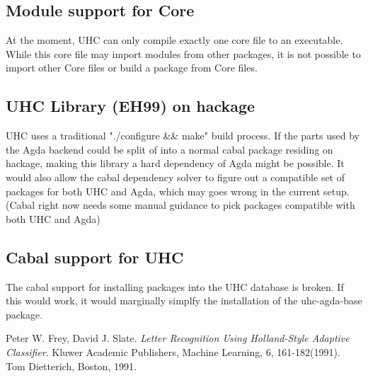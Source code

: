 \documentclass[12pt, a4paper, twoside]{report}
\begin{document}
\subsection{Module support for Core}
At the moment, UHC can only compile exactly one core file to an executable.
While this core file may import modules from other packages, it is not possible
to import other Core files or build a package from Core files.

\subsection{UHC Library (EH99) on hackage}
UHC uses a traditional "./configure \&\& make" build process. If the parts used by the
Agda backend could be split of into a normal cabal package residing on hackage,
making this library a hard dependency of Agda might be possible.
It would also allow the cabal dependency solver to figure out a compatible
set of packages for both UHC and Agda, which may goes wrong in the current setup.
(Cabal right now needs some manual guidance to pick packages compatible with both UHC and Agda)

\subsection{Cabal support for UHC}
The cabal support for installing packages into the UHC database is broken. If this would work, it
would marginally simplfy the installation of the uhc-agda-base package.

\begin{thebibliography}{1}

  Peter W. Frey, David J. Slate.
  \emph{Letter Recognition Using Holland-Style Adaptive Classifier}.
  Kluwer Academic Publishers,
  Machine Learning, 6, 161-182(1991).
  Tom Dietterich, Boston,
  1991.

\end{thebibliography}
\end{document}

